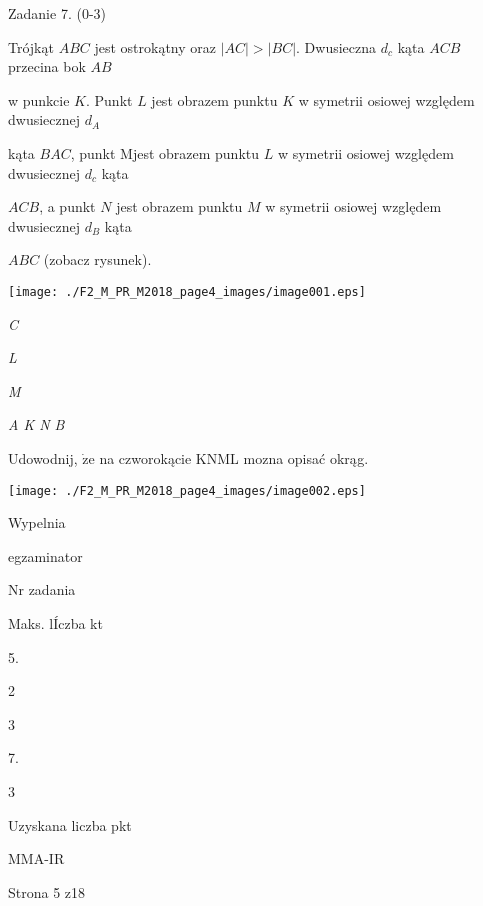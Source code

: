 \documentclass[a4paper,12pt]{article}
\begin{document}
Zadanie 7. (0-3)

Trójkąt $ABC$ jest ostrokątny oraz $|AC|>|BC|$. Dwusieczna $d_{c}$ kąta $ACB$ przecina bok $AB$

w punkcie $K$. Punkt $L$ jest obrazem punktu $K$ w symetrii osiowej względem dwusiecznej $d_{A}$

kąta $BAC$, punkt Mjest obrazem punktu $L$ w symetrii osiowej względem dwusiecznej $d_{c}$ kąta

$ACB$, a punkt $N$ jest obrazem punktu $M$ w symetrii osiowej względem dwusiecznej $d_{B}$ kąta

$ABC$ (zobacz rysunek).
\begin{center}
\texttt{[image: ./F2\_M\_PR\_M2018\_page4\_images/image001.eps]}
\end{center}
{\it C}

{\it L}

{\it M}

{\it A  K N  B}

Udowodnij, $\dot{\mathrm{z}}\mathrm{e}$ na czworokącie KNML mozna opisać okrąg.
\begin{center}
\texttt{[image: ./F2\_M\_PR\_M2018\_page4\_images/image002.eps]}
\end{center}
Wypelnia

egzaminator

Nr zadania

Maks. lÍczba kt

5.

2

3

7.

3

Uzyskana liczba pkt

MMA-IR

Strona 5 z18
\end{document}
